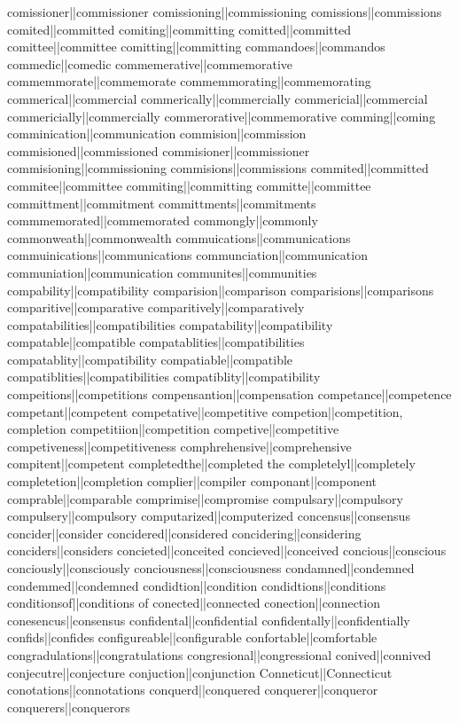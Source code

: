 comissioner||commissioner
comissioning||commissioning
comissions||commissions
comited||committed
comiting||committing
comitted||committed
comittee||committee
comitting||committing
commandoes||commandos
commedic||comedic
commemerative||commemorative
commemmorate||commemorate
commemmorating||commemorating
commerical||commercial
commerically||commercially
commericial||commercial
commericially||commercially
commerorative||commemorative
comming||coming
comminication||communication
commision||commission
commisioned||commissioned
commisioner||commissioner
commisioning||commissioning
commisions||commissions
commited||committed
commitee||committee
commiting||committing
committe||committee
committment||commitment
committments||commitments
commmemorated||commemorated
commongly||commonly
commonweath||commonwealth
commuications||communications
commuinications||communications
communciation||communication
communiation||communication
communites||communities
compability||compatibility
comparision||comparison
comparisions||comparisons
comparitive||comparative
comparitively||comparatively
compatabilities||compatibilities
compatability||compatibility
compatable||compatible
compatablities||compatibilities
compatablity||compatibility
compatiable||compatible
compatiblities||compatibilities
compatiblity||compatibility
compeitions||competitions
compensantion||compensation
competance||competence
competant||competent
competative||competitive
competion||competition, completion
competitiion||competition
competive||competitive
competiveness||competitiveness
comphrehensive||comprehensive
compitent||competent
completedthe||completed the
completelyl||completely
completetion||completion
complier||compiler
componant||component
comprable||comparable
comprimise||compromise
compulsary||compulsory
compulsery||compulsory
computarized||computerized
concensus||consensus
concider||consider
concidered||considered
concidering||considering
conciders||considers
concieted||conceited
concieved||conceived
concious||conscious
conciously||consciously
conciousness||consciousness
condamned||condemned
condemmed||condemned
condidtion||condition
condidtions||conditions
conditionsof||conditions of
conected||connected
conection||connection
conesencus||consensus
confidental||confidential
confidentally||confidentially
confids||confides
configureable||configurable
confortable||comfortable
congradulations||congratulations
congresional||congressional
conived||connived
conjecutre||conjecture
conjuction||conjunction
Conneticut||Connecticut
conotations||connotations
conquerd||conquered
conquerer||conqueror
conquerers||conquerors
